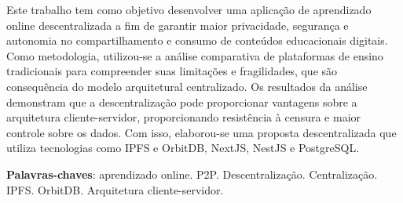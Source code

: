\begin{resumo}
Este trabalho tem como objetivo desenvolver uma aplicação de aprendizado online descentralizada a fim de garantir maior privacidade, segurança e autonomia no compartilhamento e consumo de conteúdos educacionais digitais. Como metodologia, utilizou-se a análise comparativa de plataformas de ensino tradicionais para compreender suas limitações e fragilidades, que são consequência do modelo arquitetural centralizado. Os resultados da análise demonstram que a descentralização pode proporcionar vantagens sobre a arquitetura cliente-servidor, proporcionando resistência à censura e maior controle sobre os dados. Com isso, elaborou-se uma proposta descentralizada que utiliza tecnologias como IPFS e OrbitDB, NextJS, NestJS e PostgreSQL. 

 \vspace{\onelineskip}
    
 \noindent
 \textbf{Palavras-chaves}: aprendizado online. P2P. Descentralização. Centralização. IPFS. OrbitDB. Arquitetura cliente-servidor.
\end{resumo}
